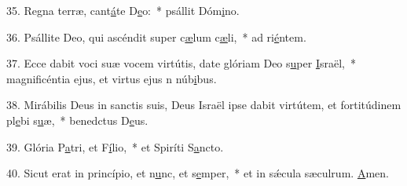 35. Regna terræ, cant\uline{á}te D\uline{e}o:~* psállit Dóm\uline{i}no.\par 
36. Psállite Deo, qui ascéndit super c\uline{æ}lum c\uline{æ}li,~* ad ri\uline{é}ntem.\par 
37. Ecce dabit voci suæ vocem virtútis, date glóriam Deo s\uline{u}per \uline{I}sraël,~* magnificéntia ejus, et virtus ejus n núb\uline{i}bus.\par 
38. Mirábilis Deus in sanctis suis, Deus Israël ipse dabit virtútem, et fortitúdinem pl\uline{e}bi s\uline{u}æ,~* benedctus D\uline{e}us.\par 
39. Glória P\uline{a}tri, et F\uline{í}lio,~* et Spiríti S\uline{a}ncto.\par 
40. Sicut erat in princípio, et n\uline{u}nc, et s\uline{e}mper,~* et in sǽcula sæculrum. \uline{A}men.\par 
